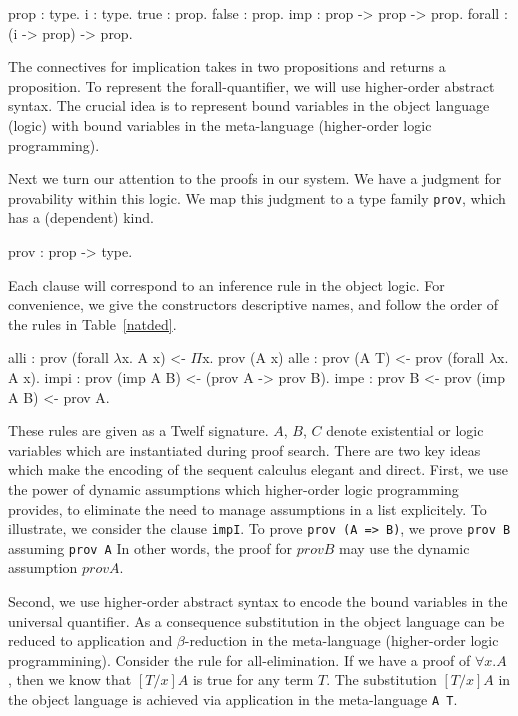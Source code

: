 \documentclass{acmconf}
\newcommand{\z}{\mbox{}}
\begin{document}
\begin{code}
prop : type.
i    : type.
\vspace{0.1in}
true   : prop.
false  : prop.
imp    : prop -> prop -> prop.
forall : (i -> prop) -> prop.
\end{code}

The connectives for implication takes in two propositions and returns a
proposition. To represent the forall-quantifier, we will use
higher-order abstract syntax. The crucial idea is to represent bound
variables in the object language (logic) with bound variables in the
meta-language (higher-order logic programming). 

Next we turn our attention to the proofs in our system. We have a
judgment for provability within this logic. We map this judgment to
a type family {\tt prov}, which has a (dependent) kind.

\begin{code}
prov : prop -> type.
\end{code}

Each clause will correspond to an inference rule in the object
logic. For convenience, we give the constructors 
descriptive names, and follow the order of the rules in
Table~\ref{natded}. 

\begin{code}
alli   : prov (forall $\lambda$x. A x)
            <- $\Pi$x. prov (A x)
alle   : prov (A T)
            <- prov (forall $\lambda$x. A x).
\z
impi     : prov (imp A B)
            <- (prov A -> prov B).
impe     : prov B
            <- prov (imp A B)
            <- prov A.
\end{code}


These rules are given as a Twelf signature. $A$, $B$, $C$ denote
existential or logic variables which are instantiated during proof
search.  
There are two key ideas which make the encoding of the sequent
calculus elegant and direct. First, we use the power of dynamic
assumptions which higher-order logic programming provides, to
eliminate the need to manage assumptions in a list explicitely. To
illustrate, we consider the clause {\tt impI}. To  prove {\tt prov (A
  => B)}, we prove {\tt prov B} assuming {\tt prov A} In other words,
the proof for $prov B$ may use the dynamic assumption $prov A$. 

Second, we use higher-order abstract syntax to encode the bound
variables in the universal quantifier. As a consequence substitution
in the object language can be reduced to application and
$\beta$-reduction in the meta-language (higher-order logic
programmining). Consider the rule for all-elimination. If we have a proof of
$\forall x.A$ , then we know that $[T/x]A$ is true for any term
$T$. The substitution $[T/x]A$ in the object language is achieved via
application in the meta-language {\tt A T}. 
\end{document}
